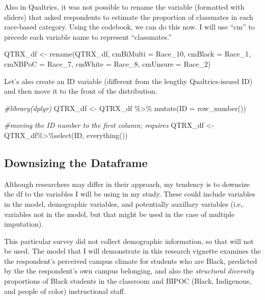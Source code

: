 \documentclass[
  english,
]{book}
\newenvironment{Shaded}{\begin{snugshade}}{\end{snugshade}}
\newcommand{\AttributeTok}[1]{\textcolor[rgb]{0.77,0.63,0.00}{#1}}
\newcommand{\CommentTok}[1]{\textcolor[rgb]{0.56,0.35,0.01}{\textit{#1}}}
\newcommand{\FunctionTok}[1]{\textcolor[rgb]{0.00,0.00,0.00}{#1}}
\newcommand{\NormalTok}[1]{#1}
\newcommand{\OtherTok}[1]{\textcolor[rgb]{0.56,0.35,0.01}{#1}}
\newcommand{\SpecialCharTok}[1]{\textcolor[rgb]{0.00,0.00,0.00}{#1}}
\begin{document}
Also in Qualtrics, it was not possible to rename the variable (formatted with sliders) that asked respondents to estimate the proportion of classmates in each race-based category. Using the codebook, we can do this now. I will use ``cm'' to precede each variable name to represent ``classmates.''

\begin{Shaded}
\begin{Highlighting}[]
\NormalTok{QTRX\_df }\OtherTok{\textless{}{-}} \FunctionTok{rename}\NormalTok{(QTRX\_df, }\AttributeTok{cmBiMulti =}\NormalTok{ Race\_10, }\AttributeTok{cmBlack =}\NormalTok{ Race\_1, }\AttributeTok{cmNBPoC =}\NormalTok{ Race\_7, }\AttributeTok{cmWhite =}\NormalTok{ Race\_8, }\AttributeTok{cmUnsure =}\NormalTok{ Race\_2)}
\end{Highlighting}
\end{Shaded}

Let's also create an ID variable (different from the lengthy Qualtrics-issued ID) and then move it to the front of the distribution.

\begin{Shaded}
\begin{Highlighting}[]
\CommentTok{\#library(dplyr)}
\NormalTok{QTRX\_df }\OtherTok{\textless{}{-}}\NormalTok{ QTRX\_df }\SpecialCharTok{\%\textgreater{}\%} \FunctionTok{mutate}\NormalTok{(}\AttributeTok{ID =} \FunctionTok{row\_number}\NormalTok{())}

\CommentTok{\#moving the ID number to the first column; requires }
\NormalTok{QTRX\_df }\OtherTok{\textless{}{-}}\NormalTok{ QTRX\_df}\SpecialCharTok{\%\textgreater{}\%}\FunctionTok{select}\NormalTok{(ID, }\FunctionTok{everything}\NormalTok{())}
\end{Highlighting}
\end{Shaded}

\hypertarget{downsizing-the-dataframe}{%
\subsection{Downsizing the Dataframe}\label{downsizing-the-dataframe}}

Although researchers may differ in their approach, my tendency is to downsize the df to the variables I will be using in my study. These could include variables in the model, demographic variables, and potentially auxillary variables (i.e,. variables not in the model, but that might be used in the case of multiple imputation).

This particular survey did not collect demographic information, so that will not be used. The model that I will demonstrate in this research vignette examines the the respondent's perceived campus climate for students who are Black, predicted by the the respondent's own campus belonging, and also the \emph{structural diversity} \citep{lewis_black_2019} proportions of Black students in the classroom and BIPOC (Black, Indigenous, and people of color) instructional staff.
\end{document}
